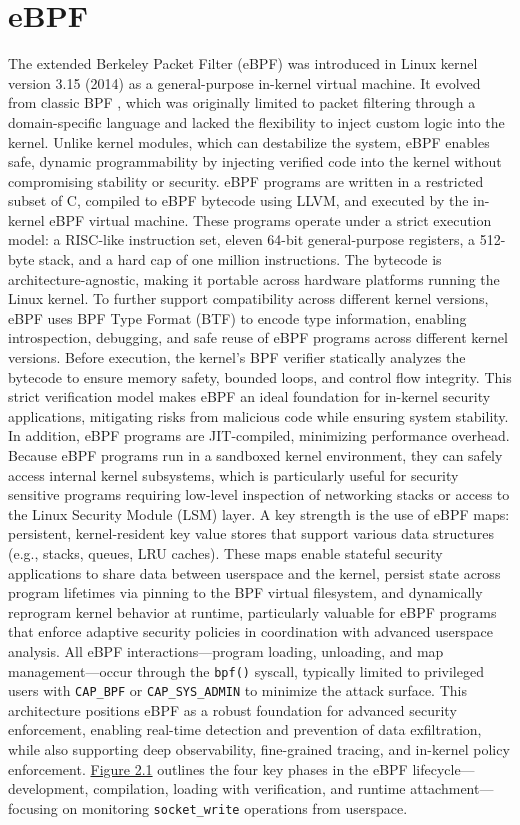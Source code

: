 \documentclass [11pt, proquest] {uwthesis}[2020/02/24]
\begin{document}
\section{eBPF}
The extended Berkeley Packet Filter (eBPF) was introduced in Linux kernel version 3.15 (2014) as a general-purpose in-kernel virtual machine. It evolved from classic BPF \cite{10.5555/1267303.1267305}, which was originally limited to packet filtering through a domain-specific language and lacked the flexibility to inject custom logic into the kernel. Unlike kernel modules, which can destabilize the system, eBPF enables safe, dynamic programmability by injecting verified code into the kernel without compromising stability or security. eBPF programs are written in a restricted subset of C, compiled to eBPF bytecode using LLVM, and executed by the in-kernel eBPF virtual machine. These programs operate under a strict execution model: a RISC-like instruction set, eleven 64-bit general-purpose registers, a 512-byte stack, and a hard cap of one million instructions. The bytecode is architecture-agnostic, making it portable across hardware platforms running the Linux kernel. To further support compatibility across different kernel versions, eBPF uses BPF Type Format (BTF) to encode type information, enabling introspection, debugging, and safe reuse of eBPF programs across different kernel versions. Before execution, the kernel’s BPF verifier statically analyzes the bytecode to ensure memory safety, bounded loops, and control flow integrity. This strict verification model makes eBPF an ideal foundation for in-kernel security applications, mitigating risks from malicious code while ensuring system stability. In addition, eBPF programs are JIT-compiled, minimizing performance overhead. Because eBPF programs run in a sandboxed kernel environment, they can safely access internal kernel subsystems, which is particularly useful for security sensitive programs requiring low-level inspection of networking stacks or access to the Linux Security Module (LSM) layer. A key strength is the use of eBPF maps: persistent, kernel-resident key value stores that support various data structures (e.g., stacks, queues, LRU caches). These maps enable stateful security applications to share data between userspace and the kernel, persist state across program lifetimes via pinning to the BPF virtual filesystem, and dynamically reprogram kernel behavior at runtime, particularly valuable for eBPF programs that enforce adaptive security policies in coordination with advanced userspace analysis. All eBPF interactions—program loading, unloading, and map management—occur through the \texttt{bpf()} syscall, typically limited to privileged users with \texttt{CAP\_BPF} or \texttt{CAP\_SYS\_ADMIN} to minimize the attack surface. This architecture positions eBPF as a robust foundation for advanced security enforcement, enabling real-time detection and prevention of data exfiltration, while also supporting deep observability, fine-grained tracing, and in-kernel policy enforcement. \hyperref[fig:eBPF-injection]{Figure 2.1} outlines the four key phases in the eBPF lifecycle—development, compilation, loading with verification, and runtime attachment—focusing on monitoring \texttt{socket\_write} operations from userspace.
\end{document}
